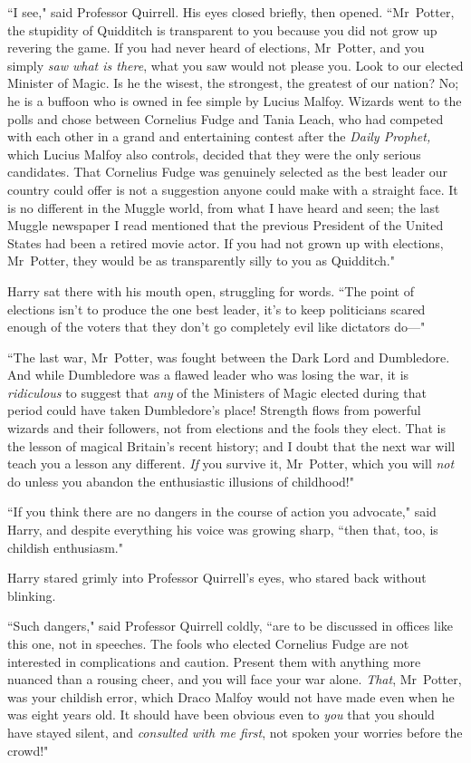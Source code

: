 ``I see," said Professor Quirrell. His eyes closed briefly, then opened. ``Mr~Potter, the stupidity of Quidditch is transparent to you because you did not grow up revering the game. If you had never heard of elections, Mr~Potter, and you simply \emph{saw what is there}, what you saw would not please you. Look to our elected Minister of Magic. Is he the wisest, the strongest, the greatest of our nation? No; he is a buffoon who is owned in fee simple by Lucius Malfoy. Wizards went to the polls and chose between Cornelius Fudge and Tania Leach, who had competed with each other in a grand and entertaining contest after the \emph{Daily Prophet,} which Lucius Malfoy also controls, decided that they were the only serious candidates. That Cornelius Fudge was genuinely selected as the best leader our country could offer is not a suggestion anyone could make with a straight face. It is no different in the Muggle world, from what I have heard and seen; the last Muggle newspaper I read mentioned that the previous President of the United States had been a retired movie actor. If you had not grown up with elections, Mr~Potter, they would be as transparently silly to you as Quidditch."

Harry sat there with his mouth open, struggling for words. ``The point of elections isn't to produce the one best leader, it's to keep politicians scared enough of the voters that they don't go completely evil like dictators do—"

``The last war, Mr~Potter, was fought between the Dark Lord and Dumbledore. And while Dumbledore was a flawed leader who was losing the war, it is \emph{ridiculous} to suggest that \emph{any} of the Ministers of Magic elected during that period could have taken Dumbledore's place! Strength flows from powerful wizards and their followers, not from elections and the fools they elect. That is the lesson of magical Britain's recent history; and I doubt that the next war will teach you a lesson any different. \emph{If} you survive it, Mr~Potter, which you will \emph{not} do unless you abandon the enthusiastic illusions of childhood!"

``If you think there are no dangers in the course of action you advocate," said Harry, and despite everything his voice was growing sharp, ``then that, too, is childish enthusiasm."

Harry stared grimly into Professor Quirrell's eyes, who stared back without blinking.

``Such dangers," said Professor Quirrell coldly, ``are to be discussed in offices like this one, not in speeches. The fools who elected Cornelius Fudge are not interested in complications and caution. Present them with anything more nuanced than a rousing cheer, and you will face your war alone. \emph{That}, Mr~Potter, was your childish error, which Draco Malfoy would not have made even when he was eight years old. It should have been obvious even to \emph{you} that you should have stayed silent, and \emph{consulted with me first}, not spoken your worries before the crowd!"

